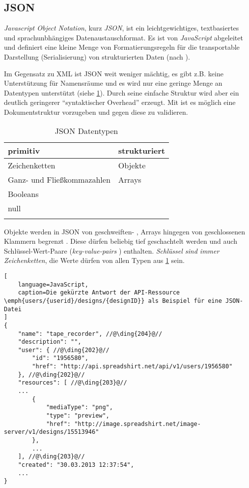 \subsection{JSON}

\begin{thesisDefinition}[JSON]
\emph{Javascript Object Notation}, kurz \emph{JSON}, ist ein leichtgewichtiges, textbasiertes und sprachunbhängiges Datenaustauschformat. Es ist von \emph{JavaScript} abgeleitet und definiert eine kleine Menge von Formatierungsregeln für die transportable Darstellung (Serialisierung) von strukturierten Daten (nach \cite{JSONRFC}).
\end{thesisDefinition}

Im Gegensatz zu XML ist JSON weit weniger mächtig, es gibt z.B. keine Unterstützung für Namensräume und es wird nur eine geringe Menge an Datentypen unterstützt (siehe \cref{tab:jsonDatatypes}). 
Durch seine einfache Struktur wird aber ein deutlich geringerer \enquote{syntaktischer Overhead} erzeugt.
Mit  ist es möglich eine Dokumentstruktur vorzugeben und gegen diese zu validieren. 

\begin{longtable}[tb]{l l}
    \toprule
    \rowcolor{lightgray}
    \textbf{primitiv}   & \textbf{strukturiert}\\
    \midrule
    Zeichenketten       & Objekte\\
    Ganz- und 
    Fließkommazahlen    & Arrays\\
    Booleans            & \\
    null                & \\
    \bottomrule
    \caption{JSON Datentypen}
    \label{tab:jsonDatatypes}
\end{longtable}

Objekte werden in JSON von geschweiften- , Arrays hingegen von geschlossenen Klammern begrenzt . Diese dürfen beliebig tief geschachtelt werden und auch Schlüssel-Wert-Paare (\emph{key-value-pairs} ) enthalten. \emph{Schlüssel sind immer Zeichenketten}, die Werte dürfen von allen Typen aus \cref{tab:jsonDatatypes} sein.
%
%
\begin{lstlisting}[
    language=JavaScript,
    caption=Die gekürzte Antwort der API-Ressource \emph{users/{userid}/designs/{designID}} als Beispiel für eine JSON-Datei
]
{
    "name": "tape_recorder", //@\ding{204}@//
    "description": "",
    "user": { //@\ding{202}@//
        "id": "1956580",
        "href": "http://api.spreadshirt.net/api/v1/users/1956580"
    }, //@\ding{202}@//
    "resources": [ //@\ding{203}@//
    ...
        {
            "mediaType": "png",
            "type": "preview",
            "href": "http://image.spreadshirt.net/image-server/v1/designs/15513946"
        }, 
        ...
    ], //@\ding{203}@//
    "created": "30.03.2013 12:37:54",
    ...
}
\end{lstlisting}    
